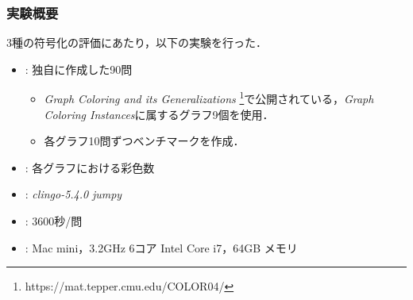 \documentclass[dvipdfmx,11pt]{beamer}
\begin{document}
\begin{comment}
\begin{frame}\frametitle{ベンチマーク}

  \begin{itemize}
    \item 現時点で組合せ遷移問題は理論面の研究が主流であり, ベンチマークの整備が必要.
    \item 実験においてステップ$t$を与えるとき, その上限値が必要となる.
    \item ステップ$t$の上限値は, グラフ$G$を$k$彩色するときの実行可能解の数と等しい.
  \end{itemize}

  従って, 全解列挙が可能な($G, k$)からベンチマークを生成する必要がある.
  
\end{frame}
\end{comment}

\begin{frame}\frametitle{実験概要}

  3種の符号化の評価にあたり，以下の実験を行った．
  \begin{itemize}
    \item {}: 独自に作成した90問
    \begin{itemize}
      \item \textit{Graph Coloring and its Generalizations}
      \footnote{https://mat.tepper.cmu.edu/COLOR04/}で公開されている，\textit{Graph Coloring Instances}に属するグラフ9個を使用．
      \item 各グラフ10問ずつベンチマークを作成．
    \end{itemize}
    \item {}: 各グラフにおける彩色数

    \item {}: \textit{clingo-5.4.0} \textit{jumpy}
    \item {}: 3600秒/問
    \item {}: Mac mini，3.2GHz 6コア Intel Core i7，64GB メモリ
  \end{itemize}
  
\end{frame}

\end{document}
